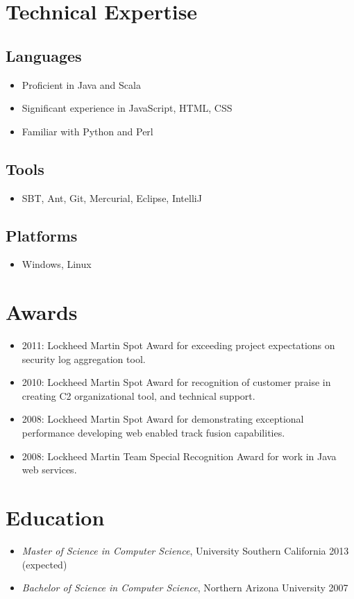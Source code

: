 \documentclass[11pt]{article}
\begin{document}
\section*{Technical Expertise}
\label{sec-2}

\subsection*{Languages}
\label{sec-2.1}

\begin{itemize}
\item Proficient in Java and Scala
\item Significant experience in JavaScript, HTML, CSS
\item Familiar with Python and Perl
\end{itemize}
\subsection*{Tools}
\label{sec-2.2}

\begin{itemize}
\item SBT, Ant, Git, Mercurial, Eclipse, IntelliJ
\end{itemize}
\subsection*{Platforms}
\label{sec-2.3}

\begin{itemize}
\item Windows, Linux
\end{itemize}
\section*{Awards}
\label{sec-3}

\begin{itemize}
\item 2011: Lockheed Martin Spot Award for exceeding project expectations on security log aggregation tool.
\item 2010: Lockheed Martin Spot Award for recognition of customer praise in creating C2 organizational tool, and technical support.
\item 2008: Lockheed Martin Spot Award for demonstrating exceptional performance developing web enabled track fusion capabilities.
\item 2008: Lockheed Martin Team Special Recognition Award for work in Java web services.
\end{itemize}
\section*{Education}
\label{sec-4}

\begin{itemize}
\item \emph{Master of Science in Computer Science}, University Southern California 2013 (expected)
\item \emph{Bachelor of Science in Computer Science}, Northern Arizona University 2007
\end{itemize}
\end{document}
